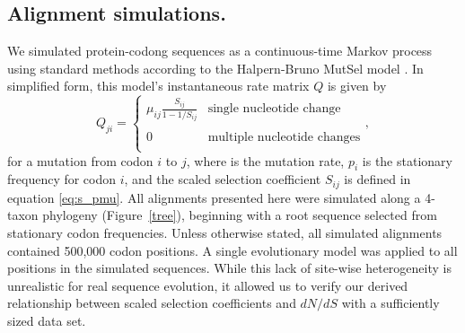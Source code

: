 \documentclass[11pt]{article}
\begin{document}
\subsection*{Alignment simulations.}
We simulated protein-codong sequences as a continuous-time Markov process using standard methods \cite{Yang2006} according to the Halpern-Bruno MutSel model \cite{HalpernBruno1998}. In simplified form, this model's instantaneous rate matrix $Q$ is given by
\begin{equation}\label{eq:HBmatrix}
Q_{ji} = \left\{ 
\begin{array}{rl}
\mu_{ij} \frac{S_{ij}}{1-1/S_{ij}} &\mbox{single nucleotide change} \\\\
0                                  &\mbox{multiple nucleotide changes} \\             
\end{array} \right.,
\end{equation} for a mutation from codon $i$ to $j$, where is the mutation rate, $p_i$ is the stationary frequency for codon $i$, and the scaled selection coefficient $S_{ij}$ is defined in equation \eqref{eq:s_pmu}. All alignments presented here were simulated along a 4-taxon phylogeny (Figure~\ref{tree}), beginning with a root sequence selected from stationary codon frequencies. Unless otherwise stated, all simulated alignments contained 500,000 codon positions. A single evolutionary model was applied to all positions in the simulated sequences. While this lack of site-wise heterogeneity is unrealistic for real sequence evolution, it allowed us to verify our derived relationship between scaled selection coefficients and $dN/dS$ with a sufficiently sized data set.

	
\end{document}
